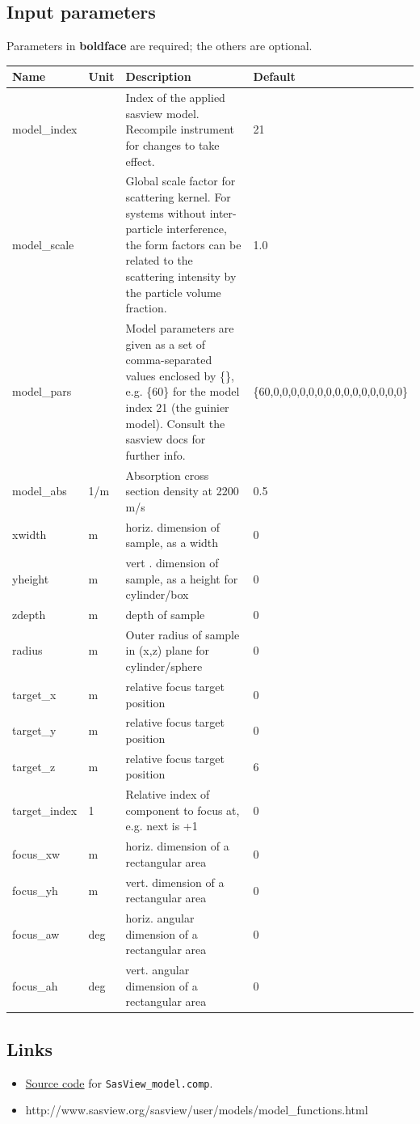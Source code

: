 \subsection*{Input parameters}
Parameters in \textbf{boldface} are required; the others are optional.

\begin{longtable}{p{}p{}p{}p{}}
\toprule
\textbf{Name} & \textbf{Unit} & \textbf{Description} & \textbf{Default} \\
\midrule
\endhead
model\_index &  & Index of the applied sasview model. Recompile instrument for changes to take effect. & 21 \\
model\_scale &  & Global scale factor for scattering kernel. For systems without inter-particle interference, the form factors  can be related to the scattering intensity by the particle volume fraction. & 1.0 \\
model\_pars &  & Model parameters are given as a set of comma-separated values enclosed by \{\}, e.g. \{60\} for the model index 21 (the guinier model). Consult the sasview docs for further info. & \{60,0,0,0,0,0,0,0,0,0,0,0,0,0,0,0\} \\
model\_abs & 1/m & Absorption cross section density at 2200 m/s & 0.5 \\
xwidth & m & horiz. dimension of sample, as a width & 0 \\
yheight & m & vert . dimension of sample, as a height for cylinder/box & 0 \\
zdepth & m & depth of sample & 0 \\
radius & m & Outer radius of sample in (x,z) plane for cylinder/sphere & 0 \\
target\_x & m & relative focus target position & 0 \\
target\_y & m & relative focus target position & 0 \\
target\_z & m & relative focus target position & 6 \\
target\_index & 1 & Relative index of component to focus at, e.g. next is +1 & 0 \\
focus\_xw & m & horiz. dimension of a rectangular area & 0 \\
focus\_yh & m & vert.  dimension of a rectangular area & 0 \\
focus\_aw & deg & horiz. angular dimension of a rectangular area & 0 \\
focus\_ah & deg & vert.  angular dimension of a rectangular area & 0 \\
\bottomrule
\end{longtable}

\subsection*{Links}
\begin{itemize}
  \item \href{run:/home/willend/willend-McCode/mcstas-comps/samples/SasView_model.comp}{Source code} for \texttt{SasView\_model.comp}.
  \item http://www.sasview.org/sasview/user/models/model\_functions.html
\end{itemize}
